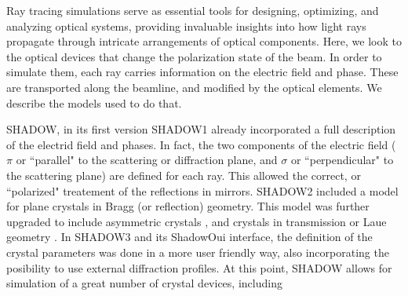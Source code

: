 \documentclass{iucr}
\begin{document}
Ray tracing simulations serve as essential tools for designing, optimizing, and analyzing optical systems, providing invaluable insights into how light rays propagate through intricate arrangements of optical components. Here, we look to the optical devices that change the polarization state of the beam. In order to simulate them, each ray carries information on the electric field and phase. These are transported along the beamline, and modified by the optical elements. We describe the models used to do that. 

SHADOW, in its first version SHADOW1 \cite{Cerrina1984} already incorporated a full description of the electrid field and phases.
In fact, the two components of the electric field ($\pi$ or ``parallel" to the scattering or diffraction plane, and $\sigma$ or ``perpendicular" to the scattering plane) are defined for each ray. 
This allowed the correct, or ``polarized" treatement of the reflections in mirrors. SHADOW2 \cite{Lai1988} included a model for plane crystals in Bragg (or reflection) geometry.
This model was further upgraded to include asymmetric crystals \cite{SanchezdelRio1992}, and crystals in transmission or Laue geometry \cite{SanchezdelRio1994}.
In SHADOW3 \cite{codeSHADOW} and its ShadowOui \cite{codeSHADOWOUI} interface, the definition of the crystal parameters was done in a more user friendly way, also incorporating the posibility to use external diffraction profiles.
At this point, SHADOW allows for simulation of a great number of crystal devices, including
\end{document}
